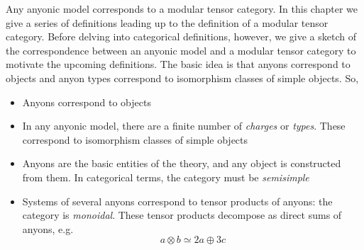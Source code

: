 Any anyonic model corresponds to a modular tensor category. In this chapter we
give a series of definitions leading up to the definition of a modular tensor
category. Before delving into categorical definitions, however, we give a
sketch of the correspondence between an anyonic model and a modular tensor
category to motivate the upcoming definitions. The basic idea is that anyons
correspond to objects and anyon types correspond to isomorphism classes of
simple objects. So,

\begin{itemize}
\item Anyons correspond to objects
\item In any anyonic model, there are a finite number of \emph{charges} or
      \emph{types}. These correspond to isomorphism classes of simple objects
\item Anyons are the basic entities of the theory, and any object is
constructed from them. In categorical terms, the category must be
\emph{semisimple}
\item Systems of several anyons correspond to tensor products of anyons: the
      category is \emph{monoidal}. These tensor products decompose as direct sums of
      anyons, e.g. 
\begin{equation}
a \otimes b \simeq 2a \oplus 3c
\end{equation}


\end{itemize}
